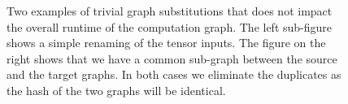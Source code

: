 \begin{figure}[htbp]
  \centering
  \quad
  \caption[Two examples of trivial graph substitutions]{Two examples of trivial graph substitutions that does not impact the overall runtime of the computation graph. The left sub-figure shows a simple renaming of the tensor inputs. The figure on the right shows that we have a common sub-graph between the source and the target graphs. In both cases we eliminate the duplicates as the hash of the two graphs will be identical.}
\end{figure}

